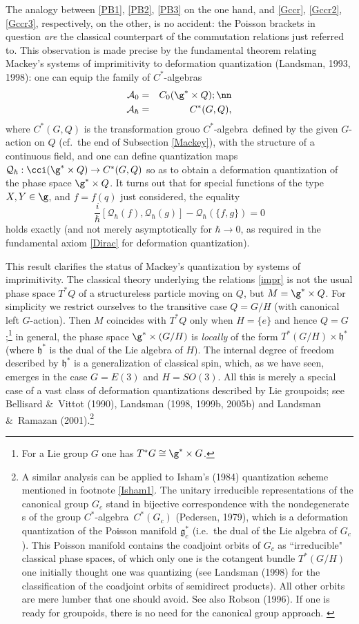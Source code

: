 \documentclass[12pt,titlepage]{article}
\newcommand{\ca}{$C^*$-algebra} \newcommand{\jba}{JB-algebra}
\newcommand{\irrep}{irreducible representation}
\newcommand{\raw}{\rightarrow} \newcommand{\rat}{\mapsto}
\newcommand{\x}{\times} \newcommand{\hb}{\hbar}
\newcommand{\qh}{q_{\hbar}} \newcommand{\sgh}{\sigma_{\hbar}}
\newcommand{\er}{\eqref}
\newcommand{\h}{\mathfrak{h}}
\newcommand{\CA}{{\mathcal A}} \newcommand{\CB}{{\mathcal B}}
\newcommand{\CQ}{{\mathcal Q}} \newcommand{\CR}{{\mathcal R}}
\renewcommand{\qh}{\CQ_{\hbar}}
\begin{document}
The analogy between \er{PB1}, \er{PB2},  \er{PB3} on the one hand, and  \er{Gccr},  \er{Gccr2},  \er{Gccr3}, respectively, on the other, is no accident: the Poisson brackets in question {\it are} the  classical counterpart  of the commutation relations just referred to. This observation is made precise by the fundamental theorem relating Mackey's systems of imprimitivity to deformation quantization (Landsman, 1993, 1998): one can equip the family of \ca s 
\begin{eqnarray}
\CA_0 &=& C_0(\g^*\times Q); \nn\\
\CA_{\hbar} &=& C^*(G,Q),
\end{eqnarray}
  where $C^*(G,Q)$ is the transformation grouo \ca\ defined by the given $G$-action on $Q$ (cf.\ the end of Subsection \ref{Mackey}), with the structure of a continuous field, and one can define quantization maps $\qh:\cci(\g^*\times Q)\raw C^*(G,Q)$ so as to obtain a deformation quantization of the phase space $\g^*\x Q$. It turns out that for special functions of the type $X,Y\in\g$, and $f=f(q)$ just considered, the equality
  \begin{equation}
\frac{i}{\hbar}[\CQ_{\hbar}(f),\CQ_{\hbar}(g)]-\CQ_{\hbar}(\{f,g\}) =0 \label{Diracexact}
\end{equation}
  holds  exactly (and  not merely asymptotically for $\hbar\raw 0$, as required in the fundamental axiom \er{Dirac} for deformation quantization).
  
 This result clarifies the status of Mackey's quantization by systems of imprimitivity. The classical theory underlying the relations \er{impr} is not the usual phase space $T^*Q$ of a structureless particle moving on $Q$, but $M=\g^*\times Q$. For simplicity we restrict ourselves to the transitive case $Q=G/H$ (with canonical left $G$-action). Then $M$ coincides with $T^*Q$ only when $H=\{e\}$ and hence $Q=G$;\footnote{For a Lie group $G$ one has $T^*G\cong \g^*\x G$.} in general, the phase space $\g^*\times (G/H)$ is {\it locally} of the form $T^*(G/H)\x\h^*$ (where $\h^*$ is the dual of the Lie algebra of $H$). The internal degree of freedom described by $\h^*$ is a generalization of classical spin, which, as we have seen, emerges in the case $G=E(3)$ and $H=SO(3)$. All this is merely a special case of a vast class of deformation quantizations described by Lie groupoids; see Bellisard \&\ Vittot (1990),  Landsman (1998, 1999b, 2005b) and Landsman \&\ Ramazan (2001).\footnote{A similar analysis can be applied to Isham's (1984) quantization scheme mentioned in footnote \ref{Isham1}. The unitary \irrep s of the canonical group $G_c$ stand in bijective correspondence with the nondegenerate \rep s of the group \ca\ $C^*(G_c)$ (Pedersen, 1979), which is a deformation quantization of 
 the Poisson manifold $\mathfrak{g}^*_c$ (i.e.\  the dual  of the Lie algebra of $G_c$).
This Poisson manifold contains the coadjoint orbits of $G_c$ as ``irreducible" classical phase spaces, of which only one is the cotangent bundle $T^*(G/H)$ one initially thought one was quantizing (see Landsman (1998) for the classification of the coadjoint orbits of semidirect products). All other orbits are mere lumber that one should avoid. See also Robson (1996). If one is ready for groupoids, there is no need for the canonical group approach. \label{Isham2}}
\end{document}
